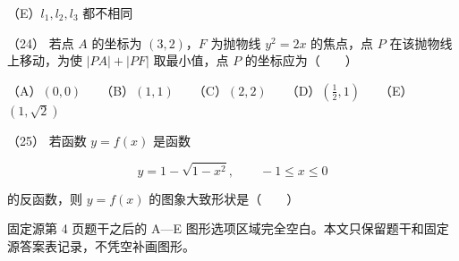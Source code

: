 \begin{question}
（E）$l_1,l_2,l_3$ 都不相同

（24） 若点 $A$ 的坐标为 $(3,2)$，$F$ 为抛物线 $y^2=2x$ 的焦点，点 $P$ 在该抛物线上移动，为使 $|PA|+|PF|$ 取最小值，点 $P$ 的坐标应为\mbox{（　　）}

（A）$(0,0)$　　（B）$(1,1)$　　（C）$(2,2)$　　（D）$(\frac12,1)$　　（E）$(1,\sqrt2)$

（25） 若函数 $y=f(x)$ 是函数

\nopagebreak[4]
\[
y=1-\sqrt{1-x^2},\qquad -1\le x\le0
\]

的反函数，则 $y=f(x)$ 的图象大致形状是\mbox{（　　）}

\begin{gktip}
固定源第 4 页题干之后的 A—E 图形选项区域完全空白。本文只保留题干和固定源答案表记录，不凭空补画图形。
\end{gktip}

\end{question}
